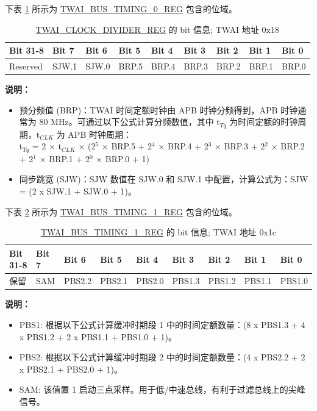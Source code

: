 \documentclass[main\_\_CN.tex]{subfiles}
\begin{document}
下表 \ref{table:Bit_timing_0} 所示为 \hyperref[regdesc:TWAIBUSTIMING0REG]{TWAI\_BUS\_TIMING\_0\_REG} 包含的位域。

\begin{longtable}[c]{|p{1.4cm}|p{1.4cm}|p{1.4cm}|p{1.4cm}|p{1.4cm}|p{1.4cm}|p{1.4cm}|p{1.4cm}|p{1.4cm}|}
\caption{\hyperref[regdesc:TWAICLOCKDIVIDERREG]{TWAI\_CLOCK\_DIVIDER\_REG} 的 bit 信息; TWAI 地址 0x18}
\label{table:Bit_timing_0}\\\hline
\rowcolor{lightgray}
   Bit 31-8 & Bit 7 & Bit 6 & Bit 5 & Bit 4 & Bit 3 & Bit 2 & Bit 1 & Bit 0\\\hline
  Reserved & SJW.1 & SJW.0 & BRP.5 & BRP.4 & BRP.3 & BRP.2 & BRP.1 & BRP.0\\\hline
\end{longtable}
\vspace{-1.5em}
{\bfseries 说明：}\\
\begin{itemize}
    \item 预分频值 (BRP)：TWAI 时间定额时钟由 APB 时钟分频得到，APB 时钟通常为 80 MHz。可通过以下公式计算分频数值，其中 t$_{Tq}$ 为时间定额的时钟周期，t$_{CLK}$ 为 APB 时钟周期：\\

t$_{Tq}$ = 2 × t$_{CLK}$ × (2$^{5}$ × BRP.5 + 2$^{4}$ × BRP.4 + 2$^{3}$ × BRP.3 + 2$^2$ × BRP.2 + 2$^1$ × BRP.1 + 2$^0$ × BRP.0 + 1)
    \item 同步跳宽 (SJW)：SJW 数值在 SJW.0 和 SJW.1 中配置，计算公式为：SJW = (2 x SJW.1 + SJW.0 + 1)。
\end{itemize}

下表 \ref{table:Bit_timing_1} 所示为 \hyperref[regdesc:TWAIBUSTIMING1REG]{TWAI\_BUS\_TIMING\_1\_REG} 包含的位域。

\begin{longtable}[c]{|p{1.4cm}|p{1.4cm}|p{1.4cm}|p{1.4cm}|p{1.4cm}|p{1.4cm}|p{1.4cm}|p{1.4cm}|p{1.4cm}|}
    \caption{\hyperref[regdesc:TWAIBUSTIMING1REG]{TWAI\_BUS\_TIMING\_1\_REG} 的 bit 信息; TWAI 地址 0x1c}
    \label{table:Bit_timing_1}\\
    \hline
       \rowcolor{lightgray}
   Bit 31-8 & Bit 7 & Bit 6 & Bit 5 & Bit 4 & Bit 3 & Bit 2 & Bit 1 & Bit 0\\\hline
   保留 & SAM & PBS2.2 & PBS2.1 & PBS2.0 & PBS1.3 &PBS1.2 & PBS1.1 & PBS1.0\\
    \hline
\end{longtable}
\vspace{-1.5em}
{\bfseries 说明：}\\
\begin{itemize}
    \item PBS1: 根据以下公式计算缓冲时期段 1 中的时间定额数量：(8 x PBS1.3 + 4 x PBS1.2 + 2 x PBS1.1 + PBS1.0 + 1)。
    \item PBS2: 根据以下公式计算缓冲时期段 2 中的时间定额数量：(4 x PBS2.2 + 2 x PBS2.1 + PBS2.0 + 1)。
    \item SAM: 该值置 1 启动三点采样。用于低/中速总线，有利于过滤总线上的尖峰信号。
\end{itemize}
\end{document}
